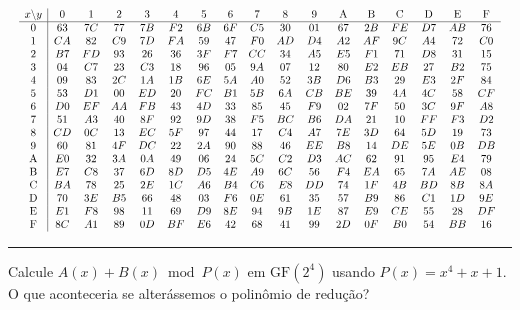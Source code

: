\documentclass[12pt,a4paper]{article}
\newcommand{\exercicio}[1]{%
    \par\vspace{1.2em}
    \noindent
    {\color{black!55}\rule[-0.25em]{3pt}{1.6em}}%
    \hspace{0.6em}{\Large\bfseries Exerc\'{i}cio #1}
    \par\vspace{-0.4em}
    \noindent{\color{black!35}\rule{\textwidth}{0.4pt}}
    \par\vspace{0.35em}
}
\begin{document}
\begingroup
\setlength{\tabcolsep}{2pt}
\renewcommand{\arraystretch}{0.95}
\scriptsize
\[
\resizebox{\textwidth}{!}{$
\begin{array}{c|cccccccccccccccc}
x \backslash y & 0 & 1 & 2 & 3 & 4 & 5 & 6 & 7 & 8 & 9 & \mathrm{A} & \mathrm{B} & \mathrm{C} & \mathrm{D} & \mathrm{E} & \mathrm{F} \\
\hline
0 & 63 & 7C & 77 & 7B & F2 & 6B & 6F & C5 & 30 & 01 & 67 & 2B & FE & D7 & AB & 76 \\
1 & CA & 82 & C9 & 7D & FA & 59 & 47 & F0 & AD & D4 & A2 & AF & 9C & A4 & 72 & C0 \\
2 & B7 & FD & 93 & 26 & 36 & 3F & F7 & CC & 34 & A5 & E5 & F1 & 71 & D8 & 31 & 15 \\
3 & 04 & C7 & 23 & C3 & 18 & 96 & 05 & 9A & 07 & 12 & 80 & E2 & EB & 27 & B2 & 75 \\
4 & 09 & 83 & 2C & 1A & 1B & 6E & 5A & A0 & 52 & 3B & D6 & B3 & 29 & E3 & 2F & 84 \\
5 & 53 & D1 & 00 & ED & 20 & FC & B1 & 5B & 6A & CB & BE & 39 & 4A & 4C & 58 & CF \\
6 & D0 & EF & AA & FB & 43 & 4D & 33 & 85 & 45 & F9 & 02 & 7F & 50 & 3C & 9F & A8 \\
7 & 51 & A3 & 40 & 8F & 92 & 9D & 38 & F5 & BC & B6 & DA & 21 & 10 & FF & F3 & D2 \\
8 & CD & 0C & 13 & EC & 5F & 97 & 44 & 17 & C4 & A7 & 7E & 3D & 64 & 5D & 19 & 73 \\
9 & 60 & 81 & 4F & DC & 22 & 2A & 90 & 88 & 46 & EE & B8 & 14 & DE & 5E & 0B & DB \\
\mathrm{A} & E0 & 32 & 3A & 0A & 49 & 06 & 24 & 5C & C2 & D3 & AC & 62 & 91 & 95 & E4 & 79 \\
\mathrm{B} & E7 & C8 & 37 & 6D & 8D & D5 & 4E & A9 & 6C & 56 & F4 & EA & 65 & 7A & AE & 08 \\
\mathrm{C} & BA & 78 & 25 & 2E & 1C & A6 & B4 & C6 & E8 & DD & 74 & 1F & 4B & BD & 8B & 8A \\
\mathrm{D} & 70 & 3E & B5 & 66 & 48 & 03 & F6 & 0E & 61 & 35 & 57 & B9 & 86 & C1 & 1D & 9E \\
\mathrm{E} & E1 & F8 & 98 & 11 & 69 & D9 & 8E & 94 & 9B & 1E & 87 & E9 & CE & 55 & 28 & DF \\
\mathrm{F} & 8C & A1 & 89 & 0D & BF & E6 & 42 & 68 & 41 & 99 & 2D & 0F & B0 & 54 & BB & 16
\end{array}
$}
\]
\endgroup

\newpage

\exercicio{1}
Calcule $A(x) + B(x) \bmod P(x)$ em $\mathrm{GF}(2^4)$ usando $P(x) = x^4 + x + 1$. O que aconteceria se alterássemos o polinômio de redução?
\end{document}
